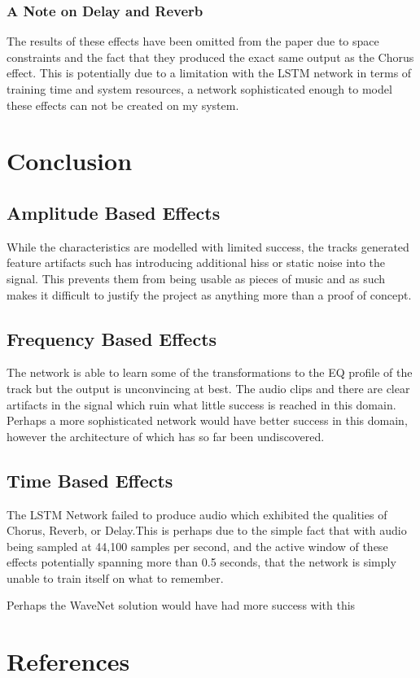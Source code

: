 \documentclass{l4proj}
\begin{document}
\subsection{A Note on Delay and
Reverb}\label{a-note-on-delay-and-reverb}

The results of these effects have been omitted from the paper due to
space constraints and the fact that they produced the exact same output
as the Chorus effect. This is potentially due to a limitation with the
LSTM network in terms of training time and system resources, a network
sophisticated enough to model these effects can not be created on my
system.

\chapter{Conclusion}\label{conclusion}

\section{Amplitude Based Effects}\label{amplitude-based-effects-1}

While the characteristics are modelled with limited success, the tracks
generated feature artifacts such has introducing additional hiss or
static noise into the signal. This prevents them from being usable as
pieces of music and as such makes it difficult to justify the project as
anything more than a proof of concept.

\section{Frequency Based Effects}\label{frequency-based-effects-1}

The network is able to learn some of the transformations to the EQ
profile of the track but the output is unconvincing at best. The audio
clips and there are clear artifacts in the signal which ruin what little
success is reached in this domain. Perhaps a more sophisticated network
would have better success in this domain, however the architecture of
which has so far been undiscovered.

\section{Time Based Effects}\label{time-based-effects-1}

The LSTM Network failed to produce audio which exhibited the qualities
of Chorus, Reverb, or Delay.This is perhaps due to the simple fact that
with audio being sampled at 44,100 samples per second, and the active
window of these effects potentially spanning more than 0.5 seconds, that
the network is simply unable to train itself on what to remember.

Perhaps the WaveNet solution would have had more success with this

\chapter{References}\label{references}
\end{document}
